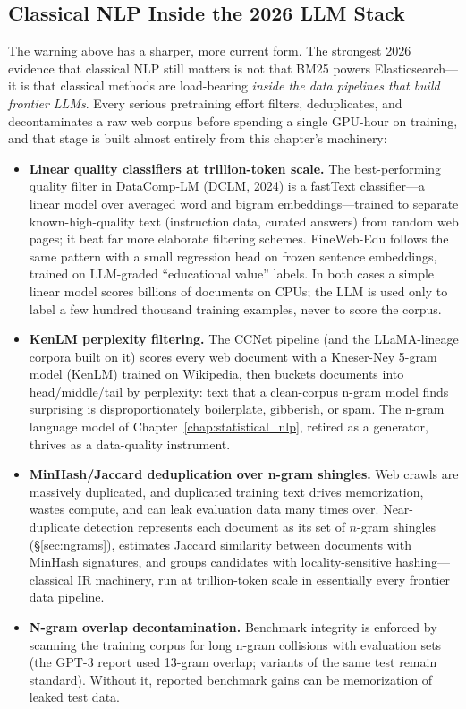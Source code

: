 \subsection{Classical NLP Inside the 2026 LLM Stack}
\label{sec:classical_llm_stack}

The warning above has a sharper, more current form. The strongest 2026 evidence that
classical NLP still matters is not that BM25 powers Elasticsearch---it is that classical
methods are load-bearing \emph{inside the data pipelines that build frontier LLMs}. Every
serious pretraining effort filters, deduplicates, and decontaminates a raw web corpus
before spending a single GPU-hour on training, and that stage is built almost entirely
from this chapter's machinery:

\begin{itemize}
    \item \textbf{Linear quality classifiers at trillion-token scale.} The
    best-performing quality filter in DataComp-LM (DCLM, 2024) is a fastText
    classifier---a linear model over averaged word and bigram embeddings---trained to
    separate known-high-quality text (instruction data, curated answers) from random web
    pages; it beat far more elaborate filtering schemes. FineWeb-Edu follows the same
    pattern with a small regression head on frozen sentence embeddings, trained on
    LLM-graded ``educational value'' labels. In both cases a simple linear model scores
    billions of documents on CPUs; the LLM is used only to label a few hundred thousand
    training examples, never to score the corpus.

    \item \textbf{KenLM perplexity filtering.} The CCNet pipeline (and the
    LLaMA-lineage corpora built on it) scores every web document with a Kneser-Ney
    5-gram model (KenLM) trained on Wikipedia, then buckets documents into
    head/middle/tail by perplexity: text that a clean-corpus n-gram model finds
    surprising is disproportionately boilerplate, gibberish, or spam. The n-gram
    language model of Chapter~\ref{chap:statistical_nlp}, retired as a generator,
    thrives as a data-quality instrument.

    \item \textbf{MinHash/Jaccard deduplication over n-gram shingles.} Web crawls are
    massively duplicated, and duplicated training text drives memorization, wastes
    compute, and can leak evaluation data many times over. Near-duplicate detection
    represents each document as its set of $n$-gram shingles (\S\ref{sec:ngrams}),
    estimates Jaccard similarity between documents with MinHash signatures, and groups
    candidates with locality-sensitive hashing---classical IR machinery, run at
    trillion-token scale in essentially every frontier data pipeline.

    \item \textbf{N-gram overlap decontamination.} Benchmark integrity is enforced by
    scanning the training corpus for long n-gram collisions with evaluation sets (the
    GPT-3 report used 13-gram overlap; variants of the same test remain standard).
    Without it, reported benchmark gains can be memorization of leaked test data.
\end{itemize}

